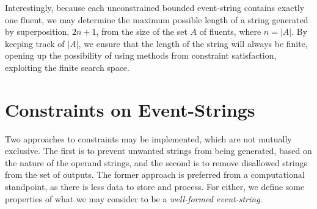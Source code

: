 \documentclass[a4paper,11pt,leqno]{article}
\makeatletter
\newcommand{\vph}[1]{\vphantom{#1}}
\newcommand{\eboxb}[1]{\fbox{$\vph{@}#1$}}
\makeatother
\begin{document}
Interestingly, because each unconstrained bounded event-string 
\eboxb{}\eboxb{e}\eboxb{} contains exactly one fluent, we may determine the 
maximum possible length of a string generated by superposition, $2n + 1$, from 
the size of the set $A$ of fluents, where $n = |A|$. By keeping track of $|A|$, 
we ensure that the length of the string will always be finite, opening up the 
possibility of using methods from constraint satisfaction, exploiting the 
finite search space.

\section{Constraints on Event-Strings}\label{constraints}
Two approaches to constraints may be implemented, which are not mutually 
exclusive. The first is to prevent unwanted strings from being generated, based 
on the nature of the operand strings, and the second is to remove disallowed 
strings from the set of outputs. The former approach is preferred from a 
computational standpoint, as there is less data to store and process. For 
either, we define some properties of what we may consider to be a 
\textit{well-formed event-string}.
\end{document}
